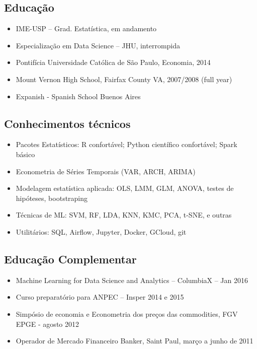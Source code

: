 \documentclass{article}
\begin{document}
\begin{multicols}{2}
\normalsize

\subsection{Educação}
\begin{itemize}
\item{IME-USP – Grad. Estatística, em andamento} 
\item{Especialização em Data Science – JHU, interrompida} 
\item{Pontifícia Universidade Católica de São Paulo, Economia, 2014}
\item{Mount Vernon High School, Fairfax County VA, 2007/2008 (full year)}
\item{Expanish - Spanish School Buenos Aires}
\end{itemize}


\subsection{Conhecimentos técnicos}
\begin{itemize}
\item{Pacotes Estatísticos: R confortável; Python científico confortável; Spark básico} 
\item{Econometria de Séries Temporais (VAR, ARCH, ARIMA)} 
\item{Modelagem estatística aplicada: OLS, LMM, GLM, ANOVA, testes de hipóteses, bootstraping}
\item{Técnicas de ML: SVM, RF, LDA, KNN, KMC, PCA, t-SNE, e outras}
\item{Utilitários: SQL, Airflow, Jupyter, Docker, GCloud, git}
\end{itemize}


\subsection{Educação Complementar}
\begin{itemize}
\item{Machine Learning for Data Science and Analytics – ColumbiaX – Jan 2016} 
\item{Curso preparatório para ANPEC – Insper 2014 e 2015} 
\item{Simpósio de economia e Econometria dos preços das commodities, FGV EPGE - agosto 2012} 
\item{Operador de Mercado Financeiro Banker, Saint Paul, março a junho de 2011}
\end{itemize}


\end{multicols}
\end{document}
